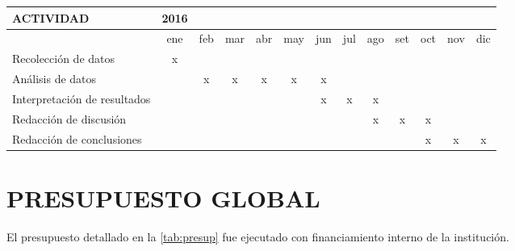 \documentclass[
  a4paper]{article}
\begin{document}
\begin{table}[ht]
        \label{tab:crono}
        \vspace{-1mm}
\begin{center}
\begin{tabular}{lcccccccccccc}
  \hline
  \textbf{ACTIVIDAD} & 
  \textbf{2016} & & & & & & & & & & &\\
  \hline
  & 
  ene & feb & mar & abr & may & jun & jul & ago & set & oct & nov & dic\\
  \cline{2-13}
  Recolección de datos & 
  x & & & & & & & & & & &\\
  \cline{2-13}
  Análisis de datos & 
  & x & x & x & x & x & & & & & &\\
  \cline{2-13}
  Interpretación de resultados & 
  & & & & & x & x & x & & & &\\
  \cline{2-13}
  Redacción de discusión & 
  & & & & & & & x & x & x & &\\
  \cline{2-13}
  Redacción de conclusiones & 
  & & & & & & & & & x & x & x\\
  \hline
\end{tabular}
\end{center}
\end{table}

\hypertarget{presupuesto-global}{%
\section{PRESUPUESTO GLOBAL}\label{presupuesto-global}}

El presupuesto detallado en la \autoref{tab:presup} fue ejecutado con
financiamiento interno de la institución.
\end{document}
